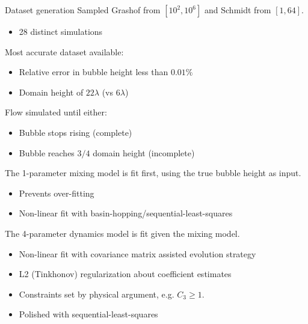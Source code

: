 \documentclass[12pt]{beamer}
\begin{document}
\begin{frame}{Dataset generation}
Sampled Grashof from $\left[10^2,10^6\right]$ and Schmidt from $\left[1,64\right]$.
\begin{itemize}
  \item 28 distinct simulations
\end{itemize}
\vspace{10pt} \pause

Most accurate dataset available:
\begin{itemize}
  \item Relative error in bubble height less than $0.01\%$
  \item Domain height of $22\lambda$ (vs $6\lambda$)
\end{itemize}
\vspace{10pt} \pause

Flow simulated until either:
\begin{itemize}
  \item Bubble stops rising (complete)
  \item Bubble reaches $3/4$ domain height (incomplete)
\end{itemize}
\end{frame}

\begin{frame}
The 1-parameter mixing model is fit first, using the true bubble height as input.
\begin{itemize}
  \item Prevents over-fitting
  \item Non-linear fit with basin-hopping/sequential-least-squares
\end{itemize}
\vspace{20pt} \pause

The 4-parameter dynamics model is fit given the mixing model.
\begin{itemize}
  \item Non-linear fit with covariance matrix assisted evolution strategy
  \item L2 (Tinkhonov) regularization about coefficient estimates
  \item Constraints set by physical argument, e.g. $C_3 \ge 1$.
  \item Polished with sequential-least-squares
\end{itemize}
\end{frame}

\end{document}
